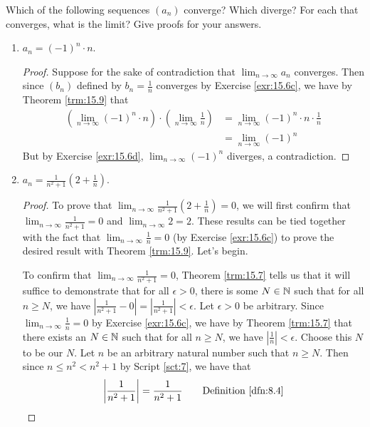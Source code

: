 \documentclass[../main.tex]{subfiles}
\begin{document}
\begin{exercise}\label{exr:15.10}
    Which of the following sequences $(a_n)$ converge? Which diverge? For each that converges, what is the limit? Give proofs for your answers.
    \begin{enumerate}[label={(\alph*)},ref={\theexercise\alph*}]
        \item \label{exr:15.10a}$a_n=(-1)^n\cdot n$.
        \begin{proof}
            Suppose for the sake of contradiction that $\lim_{n\to\infty}a_n$ converges. Then since $(b_n)$ defined by $b_n=\frac{1}{n}$ converges by Exercise \ref{exr:15.6c}, we have by Theorem \ref{trm:15.9} that
            \begin{align*}
                \left( \lim_{n\to\infty}(-1)^n\cdot n \right)\cdot\left( \lim_{n\to\infty}\frac{1}{n} \right) &= \lim_{n\to\infty}(-1)^n\cdot n\cdot\frac{1}{n}\\
                &= \lim_{n\to\infty}(-1)^n
            \end{align*}
            But by Exercise \ref{exr:15.6d}, $\lim_{n\to\infty}(-1)^n$ diverges, a contradiction.
        \end{proof}
        \item \label{exr:15.10b}$a_n=\frac{1}{n^2+1}(2+\frac{1}{n})$.
        \begin{proof}
            To prove that $\lim_{n\to\infty}\frac{1}{n^2+1}(2+\frac{1}{n})=0$, we will first confirm that $\lim_{n\to\infty}\frac{1}{n^2+1}=0$ and $\lim_{n\to\infty}2=2$. These results can be tied together with the fact that $\lim_{n\to\infty}\frac{1}{n}=0$ (by Exercise \ref{exr:15.6c}) to prove the desired result with Theorem \ref{trm:15.9}. Let's begin.\par
            To confirm that $\lim_{n\to\infty}\frac{1}{n^2+1}=0$, Theorem \ref{trm:15.7} tells us that it will suffice to demonstrate that for all $\epsilon>0$, there is some $N\in\mathbb{N}$ such that for all $n\geq N$, we have $|\frac{1}{n^2+1}-0|=|\frac{1}{n^2+1}|<\epsilon$. Let $\epsilon>0$ be arbitrary. Since $\lim_{n\to\infty}\frac{1}{n}=0$ by Exercise \ref{exr:15.6c}, we have by Theorem \ref{trm:15.7} that there exists an $N\in\mathbb{N}$ such that for all $n\geq N$, we have $|\frac{1}{n}|<\epsilon$. Choose this $N$ to be our $N$. Let $n$ be an arbitrary natural number such that $n\geq N$. Then since $n\leq n^2<n^2+1$ by Script \ref{sct:7}, we have that
            \begin{align*}
                \left| \frac{1}{n^2+1} \right| &= \frac{1}{n^2+1}\tag*{Definition \ref{dfn:8.4}}\\

\end{align*}
\end{proof}
\end{enumerate}
\end{exercise}
\end{document}
